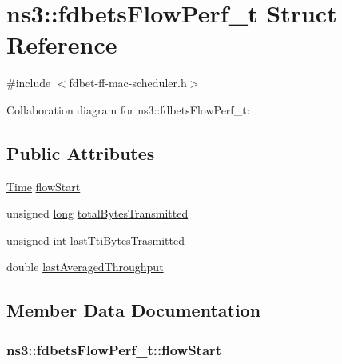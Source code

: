 \hypertarget{structns3_1_1fdbetsFlowPerf__t}{}\section{ns3\+:\+:fdbets\+Flow\+Perf\+\_\+t Struct Reference}
\label{structns3_1_1fdbetsFlowPerf__t}


{\ttfamily \#include $<$fdbet-\/ff-\/mac-\/scheduler.\+h$>$}



Collaboration diagram for ns3\+:\+:fdbets\+Flow\+Perf\+\_\+t\+:
\subsection*{Public Attributes}
\begin{DoxyCompactItemize}
\item 
\hyperlink{classns3_1_1Time}{Time} \hyperlink{structns3_1_1fdbetsFlowPerf__t_acf26ed0f21ead758b45df98d81a2a0c3}{flow\+Start}
\item 
unsigned \hyperlink{generate__test__data__lte__sinr_8m_a0eab6be67e93c3411f7a8b53cc297285}{long} \hyperlink{structns3_1_1fdbetsFlowPerf__t_abccf7582efedfe0362b0aed55d4d740d}{total\+Bytes\+Transmitted}
\item 
unsigned int \hyperlink{structns3_1_1fdbetsFlowPerf__t_a64b151a181370ae120be35bafd09caf7}{last\+Tti\+Bytes\+Trasmitted}
\item 
double \hyperlink{structns3_1_1fdbetsFlowPerf__t_a85438df6d0de2b768527573b594f7acf}{last\+Averaged\+Throughput}
\end{DoxyCompactItemize}


\subsection{Member Data Documentation}
\subsubsection[{\texorpdfstring{flow\+Start}{flowStart}}]{ ns3\+::fdbets\+Flow\+Perf\+\_\+t\+::flow\+Start}\hypertarget{structns3_1_1fdbetsFlowPerf__t_acf26ed0f21ead758b45df98d81a2a0c3}{}\label{structns3_1_1fdbetsFlowPerf__t_acf26ed0f21ead758b45df98d81a2a0c3}
